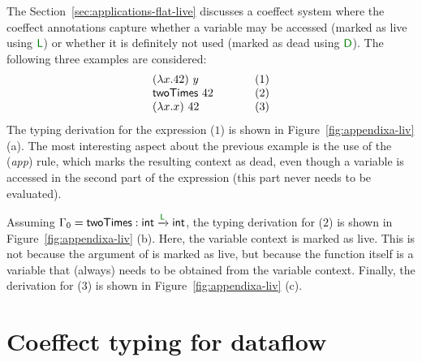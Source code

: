 \newcommand{\vrl}{\cclrd{\ident{L}}}
\newcommand{\vrd}{\cclrd{\ident{D}}}

The Section~\ref{sec:applications-flat-live} discusses a coeffect system where the coeffect 
annotations capture whether a variable may be accessed (marked as live using $\vrl$) or 
whether it is definitely not used (marked as dead using $\vrd$). The following three examples
are considered:
%
\begin{equation*}
\begin{array}{lll}
(\lambda x . 42)~y &~\hspace{1em}~&(1)\\
\textnormal{\sffamily twoTimes}~42          &&(2)\\
(\lambda x . x)~42 &&(3)\\
\end{array}
\end{equation*}
%
The typing derivation for the expression ($1$) is shown in Figure~\ref{fig:appendixa-liv} (a).
The most interesting aspect about the previous example is the use of the (\emph{app}) rule, which
marks the resulting context as dead, even though a variable is accessed in the second part of the
expression (this part never needs to be evaluated). 

Assuming $\Gamma_0 = \ident{twoTimes} : \ident{int} \xrightarrow{\vrl} \ident{int}$,
the typing derivation for ($2$) is shown in Figure~\ref{fig:appendixa-liv} (b).
Here, the variable context is marked as live. This is not because the argument of  
is marked as live, but because the function itself is a variable that (always) needs to be obtained
from the variable context. Finally, the derivation for ($3$) is shown in Figure~\ref{fig:appendixa-liv} (c).


\section{Coeffect typing for dataflow}
\label{sec:appendixa-dataflow}

